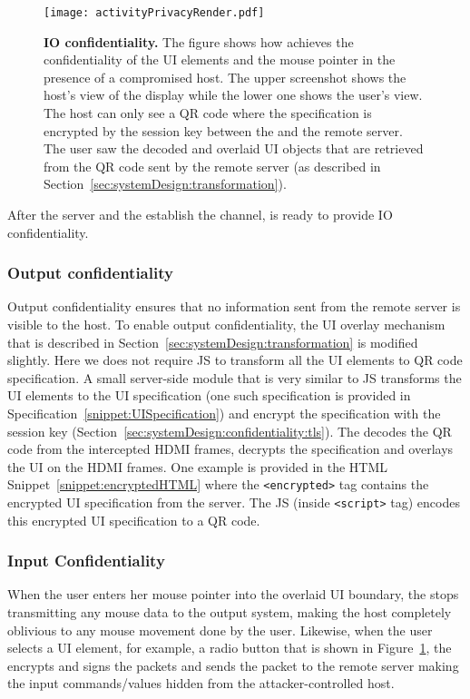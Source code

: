 \begin{figure}[t]
\centering
\texttt{[image: activityPrivacyRender.pdf]}
\caption{\textbf{IO confidentiality.} The figure shows how \name achieves the confidentiality of the UI elements and the mouse pointer in the presence of a compromised host. The upper screenshot shows the host's view of the display while the lower one shows the user's view. The host can only see a QR code where the specification is encrypted by the \tls session key between the \device and the remote server. The user saw the decoded and overlaid UI objects that are retrieved from the QR code sent by the remote server (as described in Section~\ref{sec:systemDesign:transformation}).}
\spacesave
\label{fig:activityPrivacy}
\centering
\end{figure}

After the server and the \device establish the \tls channel, \name is ready to provide IO confidentiality.

\subsubsection{\bfseries Output confidentiality} Output confidentiality ensures that no information sent from the remote server is visible to the host. To enable output confidentiality, the UI overlay mechanism that is described in Section~\ref{sec:systemDesign:transformation} is modified slightly. Here we \name does not require \name JS to transform all the UI elements to QR code specification. A small server-side module that is very similar to \name JS transforms the UI elements to the UI specification (one such specification is provided in Specification~\ref{snippet:UISpecification}) and encrypt the specification with the \tls session key (Section~\ref{sec:systemDesign:confidentiality:tls}). The \device decodes the QR code from the intercepted HDMI frames, decrypts the specification and overlays the UI on the HDMI frames. One example is provided in the HTML Snippet~\ref{snippet:encryptedHTML} where the \texttt{<encrypted>} tag contains the encrypted UI specification from the server. The \name JS (inside \texttt{<script>} tag) encodes this encrypted UI specification to a QR code.

\subsubsection{\bfseries Input Confidentiality} When the user enters her mouse pointer into the overlaid UI boundary, the \device stops transmitting any mouse data to the output system, making the host completely oblivious to any mouse movement done by the user. Likewise, when the user selects a UI element, for example, a radio button that is shown in Figure~\ref{fig:activityPrivacy}, the \device encrypts and signs the packets and sends the packet to the remote server making the input commands/values hidden from the attacker-controlled host.  

